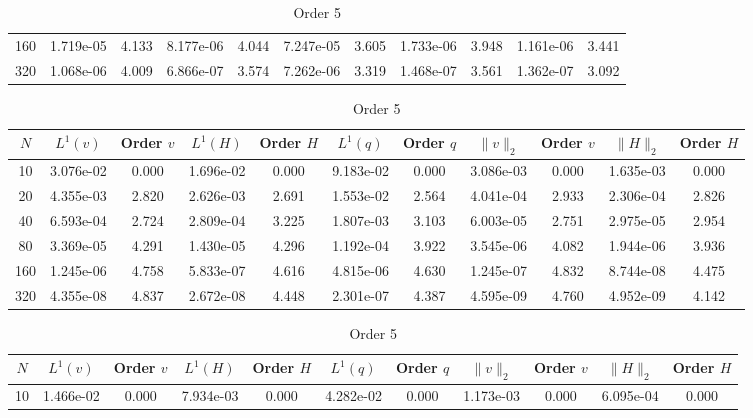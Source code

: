 \documentclass[english]{article}
\theoremstyle{thmstyleone}
\theoremstyle{thmstyletwo}
\theoremstyle{thmstylethree}
\begin{document}
\begin{table}[ht]
\begin{adjustbox}{width=1\textwidth}
\begin{subtable}{1.\linewidth}
\begin{tabular}{ccccccccccc}
					160 & 1.719e-05 & 4.133 & 8.177e-06 & 4.044 & 7.247e-05 & 3.605 & 1.733e-06 & 3.948 & 1.161e-06 & 3.441 \\
					320 & 1.068e-06 & 4.009 & 6.866e-07 & 3.574 & 7.262e-06 & 3.319 & 1.468e-07 & 3.561 & 1.362e-07 & 3.092 \\
					\bottomrule
				\end{tabular}
		\end{subtable}
	\end{adjustbox}
	\begin{adjustbox}{width=1\textwidth}
		\small
		\begin{subtable}{1.\linewidth}
			\centering
			\caption{Order 4}
			\begin{tabular}{ccccccccccc}
				\toprule
				$N$ & $L^1(v)$ & Order $v$ & $L^1(H)$ & Order $H$ & $L^1(q)$ & Order $q$ & $\|v\|_2$ & Order $v$ & $\|H\|_2$ & Order $H$ \\
				\midrule
				10 & 3.076e-02 & 0.000 & 1.696e-02 & 0.000 & 9.183e-02 & 0.000 & 3.086e-03 & 0.000 & 1.635e-03 & 0.000 \\
				20 & 4.355e-03 & 2.820 & 2.626e-03 & 2.691 & 1.553e-02 & 2.564 & 4.041e-04 & 2.933 & 2.306e-04 & 2.826 \\
				40 & 6.593e-04 & 2.724 & 2.809e-04 & 3.225 & 1.807e-03 & 3.103 & 6.003e-05 & 2.751 & 2.975e-05 & 2.954 \\
				80 & 3.369e-05 & 4.291 & 1.430e-05 & 4.296 & 1.192e-04 & 3.922 & 3.545e-06 & 4.082 & 1.944e-06 & 3.936 \\
				160 & 1.245e-06 & 4.758 & 5.833e-07 & 4.616 & 4.815e-06 & 4.630 & 1.245e-07 & 4.832 & 8.744e-08 & 4.475 \\
				320 & 4.355e-08 & 4.837 & 2.672e-08 & 4.448 & 2.301e-07 & 4.387 & 4.595e-09 & 4.760 & 4.952e-09 & 4.142 \\
				\bottomrule
			\end{tabular}
		\end{subtable}
	\end{adjustbox}
	\begin{adjustbox}{width=1\textwidth}
		\small
		\begin{subtable}{1.\linewidth}
			\centering
			\caption{Order 5}
			\begin{tabular}{ccccccccccc}
				\toprule
				$N$ & $L^1(v)$ & Order $v$ & $L^1(H)$ & Order $H$ & $L^1(q)$ & Order $q$ & $\|v\|_2$ & Order $v$ & $\|H\|_2$ & Order $H$ \\
				\midrule
				10 & 1.466e-02 & 0.000 & 7.934e-03 & 0.000 & 4.282e-02 & 0.000 & 1.173e-03 & 0.000 & 6.095e-04 & 0.000 \\

\end{tabular}
\end{subtable}
\end{adjustbox}
\end{table}
\end{document}
